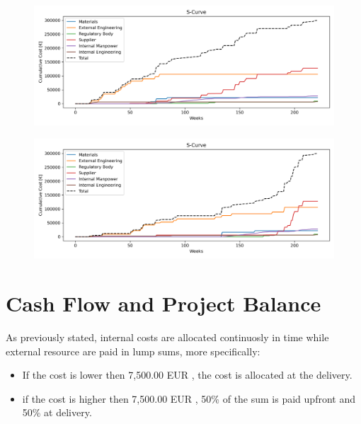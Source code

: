 \begin{figure}[p]
    \centering
            \begin{minipage}{\textwidth}
        \centering
        \includegraphics[width=\textwidth]{../s_curve_E.png}
        \label{fig:scurve_early}
    \end{minipage}\hfill
    \begin{minipage}{\textwidth}
        \centering
        \includegraphics[width=\textwidth]{../s_curve_L.png}
        \label{fig:scurve_late}
    \end{minipage}
\end{figure}


\section{Cash Flow and Project Balance}
As previously stated, internal costs are allocated continuosly in time while external resource are paid in lump sums, more specifically:
\begin{itemize}
    \item If the cost is lower then 7,500.00 EUR , the cost is allocated at the delivery.
    \item if the cost is higher then 7,500.00 EUR , 50\% of the sum is paid upfront and 50\% at delivery.
\end{itemize}

